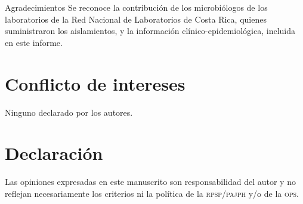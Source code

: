 \documentclass{article}
\begin{document}
Agradecimientos
Se reconoce la contribución de los microbiólogos de los laboratorios de la Red
Nacional de Laboratorios de Costa Rica, quienes suministraron los aislamientos,
y la información clínico-epidemiológica, incluida en este informe.
\section{Conflicto de intereses}

Ninguno declarado por los autores.

\section{Declaración}

Las opiniones expresadas en este manuscrito son responsabilidad del autor y no
reflejan necesariamente los criterios ni la política de la \textsc{rpsp}/\textsc{pajph} y/o de la
\textsc{ops}.
\end{document}

